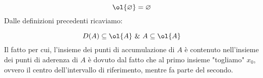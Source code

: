 \documentclass[../appunti.tex]{subfiles}
\begin{document}
\begin{equation} 
	\ol{\varnothing} = \varnothing
\end{equation}
Dalle definizioni precedenti ricaviamo:


\begin{equation}
	D(A) \subseteq \ol{A}\ \&\ A \subseteq \ol{A}
\end{equation}
Il fatto per cui, l'insieme dei punti di accumulazione di $A$ è contenuto
nell'insieme dei punti di aderenza di $A$ è dovuto dal fatto che al primo insieme
"togliamo" $x_0$, ovvero il centro dell'intervallo di riferimento, mentre
fa parte del secondo.
\end{document}
